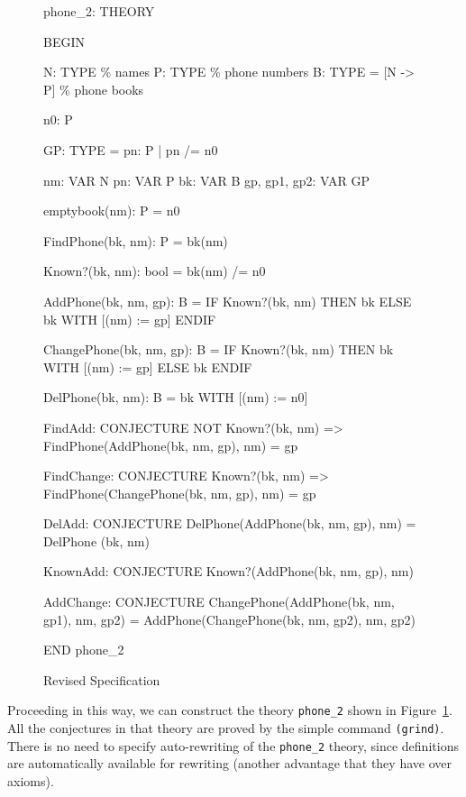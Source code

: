 \begin{figure}[htbp]
\begin{pvsexample}
phone_2: THEORY

BEGIN

  N: TYPE              \% names
  P: TYPE              \% phone numbers
  B: TYPE = [N -> P]   \% phone books

  n0: P

  GP: TYPE = {pn: P | pn /= n0}

  nm: VAR N
  pn: VAR P
  bk: VAR B
  gp, gp1, gp2: VAR GP

  emptybook(nm): P = n0

  FindPhone(bk, nm): P = bk(nm)

  Known?(bk, nm): bool = bk(nm) /= n0

  AddPhone(bk, nm, gp): B = 
    IF Known?(bk, nm) THEN bk ELSE bk WITH [(nm) := gp] ENDIF

  ChangePhone(bk, nm, gp): B = 
    IF Known?(bk, nm) THEN bk WITH [(nm) := gp] ELSE bk ENDIF

  DelPhone(bk, nm): B = bk WITH [(nm) := n0]

  FindAdd: CONJECTURE
    NOT Known?(bk, nm) => FindPhone(AddPhone(bk, nm, gp), nm) = gp

  FindChange: CONJECTURE
    Known?(bk, nm) => FindPhone(ChangePhone(bk, nm, gp), nm) = gp

  DelAdd: CONJECTURE
    DelPhone(AddPhone(bk, nm, gp), nm) = DelPhone (bk, nm)

  KnownAdd: CONJECTURE Known?(AddPhone(bk, nm, gp), nm)

  AddChange: CONJECTURE
    ChangePhone(AddPhone(bk, nm, gp1), nm, gp2) =
      AddPhone(ChangePhone(bk, nm, gp2), nm, gp2)

END phone_2
\end{pvsexample}
\caption{\label{fig2}Revised Specification}
\end{figure}
Proceeding in this way, we can construct the theory {\tt phone\_2}
shown in Figure~\ref{fig2}.  All the conjectures in that theory
are proved by the simple command {\tt (grind)}.   There is no need to
specify auto-rewriting of the {\tt phone\_2} theory, since definitions
are automatically available for rewriting (another advantage that they
have over axioms).

